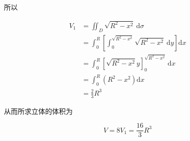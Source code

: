 \documentclass[12pt, a4paper]{article}
\numberwithin{equation}{section}
\begin{document}
    所以

    $$
        \begin{aligned}
            V_1 & =\iint_D \sqrt{R^2-x^2} \mathrm{~d} \sigma \\
            & =\int_0^R\left[\int_0^{\sqrt{R^2-x^2}} \sqrt{R^2-x^2} \mathrm{~d} y\right] \mathrm{d} x \\
            & =\int_0^R\left[\sqrt{R^2-x^2} y\right]_0^{\sqrt{R^2-x^2}} \mathrm{~d} x \\
            & =\int_0^R\left(R^2-x^2\right) \mathrm{d} x \\
            & =\frac{2}{3} R^3
        \end{aligned}
    $$

    从而所求立体的体积为

    $$
        V=8 V_1=\frac{16}{3} R^3
    $$
\end{document}
